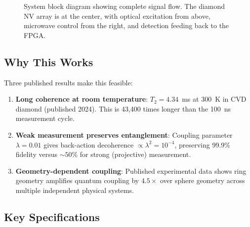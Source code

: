\documentclass[11pt,a4paper,openany]{book}
\begin{document}
\begin{figure}[H]
\caption{System block diagram showing complete signal flow. The diamond NV array is at the center, with optical excitation from above, microwave control from the right, and detection feeding back to the FPGA.}
\label{fig:system-block}
\end{figure}

\subsection{Why This Works}

Three published results make this feasible:

\begin{enumerate}[nosep]
  \item \textbf{Long coherence at room temperature}: $T_2 = 4.34$~ms at 300~K in CVD diamond (published 2024). This is 43,400 times longer than the 100~ns measurement cycle.
  \item \textbf{Weak measurement preserves entanglement}: Coupling parameter $\lambda = 0.01$ gives back-action decoherence $\propto \lambda^2 = 10^{-4}$, preserving 99.9\% fidelity versus ${\sim}50\%$ for strong (projective) measurement.
  \item \textbf{Geometry-dependent coupling}: Published experimental data shows ring geometry amplifies quantum coupling by $4.5\times$ over sphere geometry across multiple independent physical systems.
\end{enumerate}

\subsection{Key Specifications}
\end{document}
